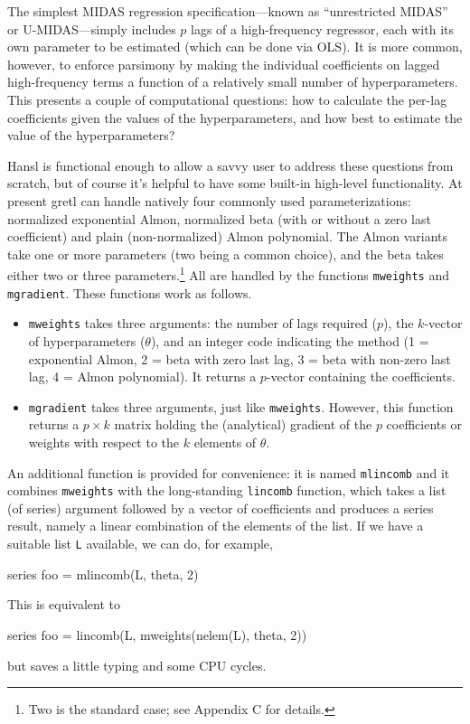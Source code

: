 \documentclass{article}
\begin{document}
The simplest MIDAS regression specification---known as ``unrestricted
MIDAS'' or U-MIDAS---simply includes $p$ lags of a high-frequency
regressor, each with its own parameter to be estimated (which can be
done via OLS). It is more common, however, to enforce parsimony by
making the individual coefficients on lagged high-frequency terms a
function of a relatively small number of hyperparameters. This
presents a couple of computational questions: how to calculate the
per-lag coefficients given the values of the hyperparameters, and how
best to estimate the value of the hyperparameters?

Hansl is functional enough to allow a savvy user to address these
questions from scratch, but of course it's helpful to have some
built-in high-level functionality. At present gretl can handle
natively four commonly used parameterizations: normalized exponential
Almon, normalized beta (with or without a zero last coefficient) and
plain (non-normalized) Almon polynomial. The Almon variants take one
or more parameters (two being a common choice), and the beta takes
either two or three parameters.\footnote{Two is the standard case; see
  Appendix C for details.}  All are handled by the functions
\texttt{mweights} and \texttt{mgradient}. These functions work as
follows.
\begin{itemize}
\item \texttt{mweights} takes three arguments: the number of lags
  required ($p$), the $k$-vector of hyperparameters ($\theta$), and an
  integer code indicating the method (1 = exponential Almon, 2 = beta
  with zero last lag, 3 = beta with non-zero last lag, 4 = Almon
  polynomial). It returns a $p$-vector containing the coefficients.
\item \texttt{mgradient} takes three arguments, just like
  \texttt{mweights}. However, this function returns a $p \times k$
  matrix holding the (analytical) gradient of the $p$ coefficients or
  weights with respect to the $k$ elements of $\theta$.
\end{itemize}

An additional function is provided for convenience: it is named
\texttt{mlincomb} and it combines \texttt{mweights} with the
long-standing \texttt{lincomb} function, which takes a list (of
series) argument followed by a vector of coefficients and produces a
series result, namely a linear combination of the elements of the
list. If we have a suitable list \texttt{L} available, we can
do, for example,
\begin{code}
series foo = mlincomb(L, theta, 2)
\end{code}
This is equivalent to
\begin{code}
series foo = lincomb(L, mweights(nelem(L), theta, 2))
\end{code}
but saves a little typing and some CPU cycles.
\end{document}
